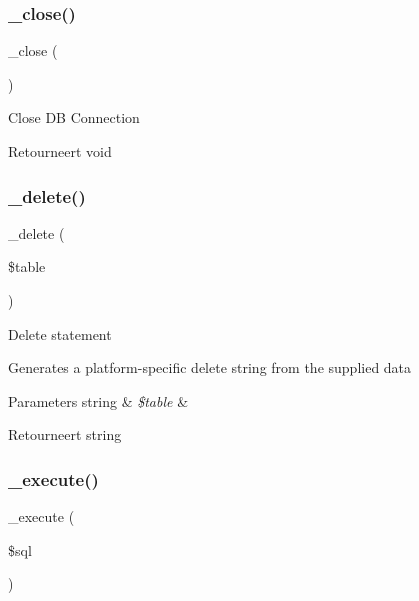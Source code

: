 \subsubsection{\texorpdfstring{\_close()}{\_close()}}
{\footnotesize\ttfamily \+\_\+close (\begin{DoxyParamCaption}{ }\end{DoxyParamCaption})\hspace{0.3cm}{\ttfamily [protected]}}

Close DB Connection

\begin{DoxyReturn}{Retourneert}
void 
\end{DoxyReturn}
\mbox{\label{class_c_i___d_b__oci8__driver_a133ea8446ded52589bd22cc9163d0896}} 
\subsubsection{\texorpdfstring{\_delete()}{\_delete()}}
{\footnotesize\ttfamily \+\_\+delete (\begin{DoxyParamCaption}\item[{}]{\$table }\end{DoxyParamCaption})\hspace{0.3cm}{\ttfamily [protected]}}

Delete statement

Generates a platform-\/specific delete string from the supplied data


\begin{DoxyParams}[1]{Parameters}
string & {\em \$table} & \\
\hline
\end{DoxyParams}
\begin{DoxyReturn}{Retourneert}
string 
\end{DoxyReturn}
\mbox{\label{class_c_i___d_b__oci8__driver_a114ab675d89bf8324a41785fb475e86d}} 
\subsubsection{\texorpdfstring{\_execute()}{\_execute()}}
{\footnotesize\ttfamily \+\_\+execute (\begin{DoxyParamCaption}\item[{}]{\$sql }\end{DoxyParamCaption})\hspace{0.3cm}{\ttfamily [protected]}}

